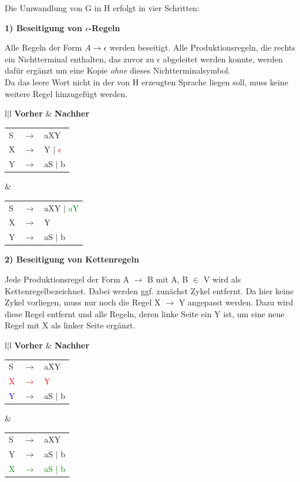 \begin{teile}
	\item
	Die Umwandlung von G in H erfolgt in vier Schritten:
 
	\textbf{1) Beseitigung von $\epsilon$-Regeln}

	Alle Regeln der Form $A \rightarrow \epsilon$ werden beseitigt. Alle Produktionsregeln, die rechts ein Nichtterminal enthalten, das zuvor zu $\epsilon$ abgeleitet werden konnte, werden dafür ergänzt um eine Kopie \textit{ohne} dieses Nichtterminalsymbol.\\
	Da das leere Wort nicht in der von H erzeugten Sprache liegen soll, muss keine weitere Regel hinzugefügt werden.

	\begin{tabular}{l|l}
		\textbf{Vorher} & \textbf{Nachher} \\
		\hline
		\begin{tabular}{lcl}
		S & $\rightarrow$ & aXY            \\
		X & $\rightarrow$ & Y $\mid$ \textcolor{red}{$\epsilon$} \\ 
		Y & $\rightarrow$ & aS $\mid$ b         \\ 
		\end{tabular} &
		\begin{tabular}{lcl}
		S  & $\rightarrow$ & aXY $\mid$ \textcolor{green}{aY}          \\
		X  & $\rightarrow$ & Y \\ 
		Y  & $\rightarrow$ & aS $\mid$ b         \\ 
		\end{tabular}
	\end{tabular}
	
	\textbf{2) Beseitigung von Kettenregeln}
	
	Jede Produktionsregel der Form A $\rightarrow$ B mit A, B $\in$ V wird als \glqq Kettenregel\grqq bezeichnet.
	Dabei werden ggf. zunächst Zykel entfernt. Da hier keine Zykel vorliegen, muss nur noch die Regel X $\rightarrow$ Y angepasst werden. Dazu wird diese Regel entfernt und alle Regeln, deren linke Seite ein Y ist, um eine neue Regel mit X als linker Seite ergänzt.
	
	\begin{tabular}{l|l}
		\textbf{Vorher} & \textbf{Nachher} \\
		\hline
		\begin{tabular}{lcl}
		S  & $\rightarrow$ & aXY                \\
		\textcolor{red}{X} & \textcolor{red}{$\rightarrow$} & \textcolor{red}{Y} \\ 
		\textcolor{blue}{Y}  & $\rightarrow$ & aS $\mid$ b         \\ 
		\end{tabular} &
		\begin{tabular}{lcl}
		S  & $\rightarrow$ & aXY                 \\
		Y  & $\rightarrow$ & aS $\mid$ b         \\
		\textcolor{green}{X}  & \textcolor{green}{$\rightarrow$} & \textcolor{green}{aS $\mid$ b}         \\ 
		\end{tabular}
	\end{tabular}
	


\end{teile}
